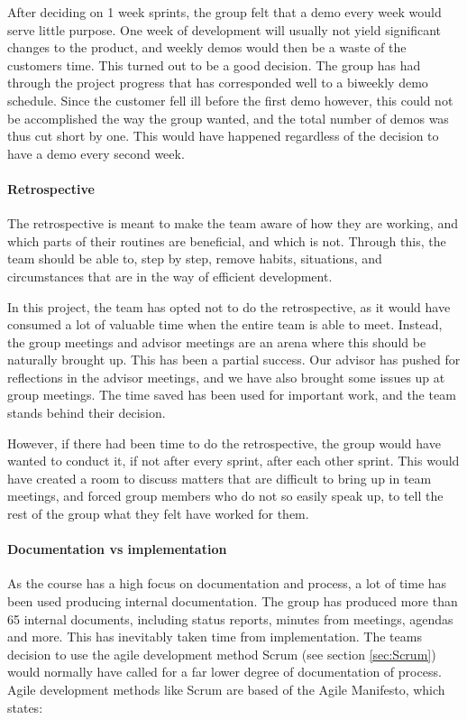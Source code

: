\documentclass[11pt,a4paper,titlepage,oneside]{report}
\begin{document}
After deciding on 1 week sprints, the group felt that a demo every week would serve little purpose. One week of development will usually not yield significant changes to the product, and weekly demos would then be a waste of the customers time. This turned out to be a good decision. The group has had through the project progress that has corresponded well to a biweekly demo schedule. Since the customer fell ill before the first demo however, this could not be accomplished the way the group wanted, and the total number of demos was thus cut short by one. This would have happened regardless of the decision to have a demo every second week.

\paragraph{Retrospective}
The retrospective is meant to make the team aware of how they are working, and which parts of their routines are beneficial, and which is not. Through this, the team should be able to, step by step, remove habits, situations, and circumstances that are in the way of efficient development.

In this project, the team has opted not to do the retrospective, as it would have consumed a lot of valuable time when the entire team is able to meet. Instead, the group meetings and advisor meetings are an arena where this should be naturally brought up. This has been a partial success. Our advisor has pushed for reflections in the advisor meetings, and we have also brought some issues up at group meetings. The time saved has been used for important work, and the team stands behind their decision. 

However, if there had been time to do the retrospective, the group would have wanted to conduct it, if not after every sprint, after each other sprint. This would have created a room to discuss matters that are difficult to bring up in team meetings, and forced group members who do not so easily speak up, to tell the rest of the group what they felt have worked for them.

\paragraph{Documentation vs implementation}
As the course has a high focus on documentation and process, a lot of time has been used producing internal documentation. The group has produced more than 65 internal documents, including status reports, minutes from meetings, agendas and more. This has inevitably taken time from implementation. The teams decision to use the agile development method Scrum (see section \ref{sec:Scrum}) would normally have called for a far lower degree of documentation of process. Agile development methods like Scrum are based of the Agile Manifesto, which states:
\end{document}

